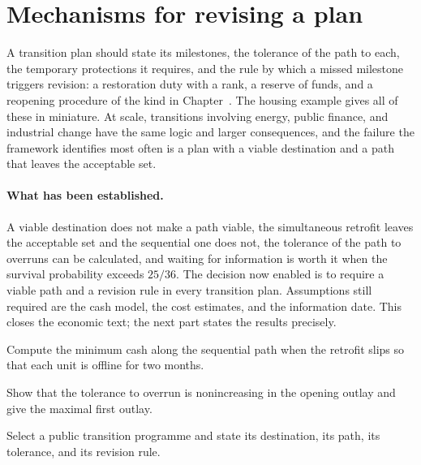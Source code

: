 \section{Mechanisms for revising a plan}

A transition plan should state its milestones, the tolerance of the path to each, the temporary protections it requires, and the rule by which a missed milestone triggers revision: a restoration duty with a rank, a reserve of funds, and a reopening procedure of the kind in Chapter~. The housing example gives all of these in miniature. At scale, transitions involving energy, public finance, and industrial change have the same logic and larger consequences, and the failure the framework identifies most often is a plan with a viable destination and a path that leaves the acceptable set.

\paragraph{What has been established.} A viable destination does not make a path viable, the simultaneous retrofit leaves the acceptable set and the sequential one does not, the tolerance of the path to overruns can be calculated, and waiting for information is worth it when the survival probability exceeds $25/36$. The decision now enabled is to require a viable path and a revision rule in every transition plan. Assumptions still required are the cash model, the cost estimates, and the information date. This closes the economic text; the next part states the results precisely.

\begin{exercise}
Compute the minimum cash along the sequential path when the retrofit slips so that each unit is offline for two months.
\end{exercise}
\begin{exercise}
Show that the tolerance to overrun is nonincreasing in the opening outlay and give the maximal first outlay.
\end{exercise}
\begin{exercise}
Select a public transition programme and state its destination, its path, its tolerance, and its revision rule.
\end{exercise}
